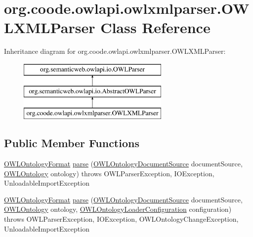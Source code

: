 \hypertarget{classorg_1_1coode_1_1owlapi_1_1owlxmlparser_1_1_o_w_l_x_m_l_parser}{\section{org.\-coode.\-owlapi.\-owlxmlparser.\-O\-W\-L\-X\-M\-L\-Parser Class Reference}
\label{classorg_1_1coode_1_1owlapi_1_1owlxmlparser_1_1_o_w_l_x_m_l_parser}
}
Inheritance diagram for org.\-coode.\-owlapi.\-owlxmlparser.\-O\-W\-L\-X\-M\-L\-Parser\-:\begin{figure}[H]
\begin{center}
\leavevmode
\includegraphics[height=3.000000cm]{classorg_1_1coode_1_1owlapi_1_1owlxmlparser_1_1_o_w_l_x_m_l_parser}
\end{center}
\end{figure}
\subsection*{Public Member Functions}
\begin{DoxyCompactItemize}
\item 
\hyperlink{classorg_1_1semanticweb_1_1owlapi_1_1model_1_1_o_w_l_ontology_format}{O\-W\-L\-Ontology\-Format} \hyperlink{classorg_1_1coode_1_1owlapi_1_1owlxmlparser_1_1_o_w_l_x_m_l_parser_aa7ce6fbe544a69e410945038dfb207fa}{parse} (\hyperlink{interfaceorg_1_1semanticweb_1_1owlapi_1_1io_1_1_o_w_l_ontology_document_source}{O\-W\-L\-Ontology\-Document\-Source} document\-Source, \hyperlink{interfaceorg_1_1semanticweb_1_1owlapi_1_1model_1_1_o_w_l_ontology}{O\-W\-L\-Ontology} ontology)  throws O\-W\-L\-Parser\-Exception, I\-O\-Exception, Unloadable\-Import\-Exception 
\item 
\hyperlink{classorg_1_1semanticweb_1_1owlapi_1_1model_1_1_o_w_l_ontology_format}{O\-W\-L\-Ontology\-Format} \hyperlink{classorg_1_1coode_1_1owlapi_1_1owlxmlparser_1_1_o_w_l_x_m_l_parser_a22bf6d7db0222e2c44a91d95e17419b5}{parse} (\hyperlink{interfaceorg_1_1semanticweb_1_1owlapi_1_1io_1_1_o_w_l_ontology_document_source}{O\-W\-L\-Ontology\-Document\-Source} document\-Source, \hyperlink{interfaceorg_1_1semanticweb_1_1owlapi_1_1model_1_1_o_w_l_ontology}{O\-W\-L\-Ontology} ontology, \hyperlink{classorg_1_1semanticweb_1_1owlapi_1_1model_1_1_o_w_l_ontology_loader_configuration}{O\-W\-L\-Ontology\-Loader\-Configuration} configuration)  throws O\-W\-L\-Parser\-Exception, I\-O\-Exception, O\-W\-L\-Ontology\-Change\-Exception, Unloadable\-Import\-Exception 
\end{DoxyCompactItemize}
